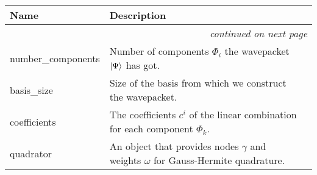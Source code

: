     \vspace{-1cm}
\hspace{\varindent}\begin{longtable}{|p{\varnamewidth}|p{\vardescrwidth}|l}
\cline{1-2}
\cline{1-2} \centering \textbf{Name} & \centering \textbf{Description}& \\
\cline{1-2}
\endhead\cline{1-2}\multicolumn{3}{r}{\small\textit{continued on next page}}\\\endfoot\cline{1-2}
\endlastfoot\raggedright n\-u\-m\-b\-e\-r\-\_\-c\-o\-m\-p\-o\-n\-e\-n\-t\-s\- & Number of components $\Phi_i$ the wavepacket
          $\Ket{\Psi}$ has got.&\\
\cline{1-2}
\raggedright b\-a\-s\-i\-s\-\_\-s\-i\-z\-e\- & Size of the basis from which we construct the wavepacket.&\\
\cline{1-2}
\raggedright c\-o\-e\-f\-f\-i\-c\-i\-e\-n\-t\-s\- & The coefficients $c^i$ of the linear
          combination for each component $\Phi_k$.&\\
\cline{1-2}
\raggedright q\-u\-a\-d\-r\-a\-t\-o\-r\- & An object that provides nodes $\gamma$ and
          weights $\omega$ for Gauss-Hermite quadrature.&\\
\cline{1-2}
\end{longtable}

